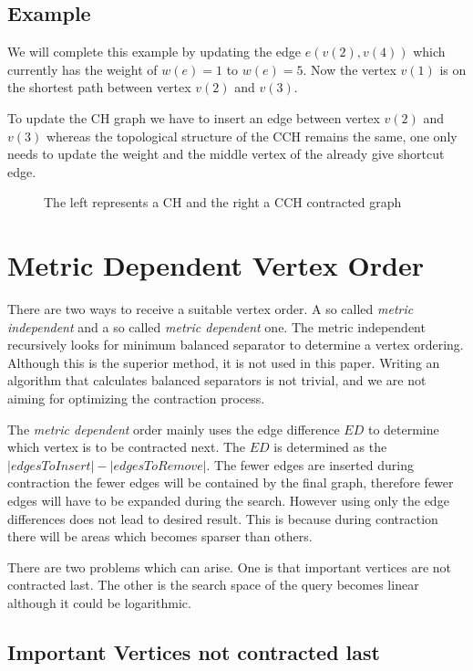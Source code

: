 \subsection{Example} 
We will complete this example by updating the edge $e(v(2), v(4))$ which currently has the weight of $w(e)=1$ to $w(e) = 5$.
Now the vertex $v(1)$ is on the shortest path between vertex $v(2)$ and $v(3)$.

To update the CH graph we have to insert an edge between vertex $v(2)$ and $v(3)$ whereas the topological structure of the CCH remains the same, one only needs to update the weight and the middle vertex of the already give shortcut edge.

\begin{figure}
    \centering
    
    \caption{The left represents a CH and the right a CCH contracted graph}
    \label{fig:DifferenceCHAndCCH}
\end{figure}

\section{Metric Dependent Vertex Order}\label{sec:metric_dependent_vertex_order}
There are two ways to receive a suitable vertex order.
A so called \textit{metric independent} and a so called \textit{metric dependent} one.
The metric independent recursively looks for minimum balanced separator to determine a vertex ordering\cite{CCH}.
Although this is the superior method, it is not used in this paper. 
Writing an algorithm that calculates balanced separators is not trivial, and we are not aiming for optimizing the contraction process.

The \textit{metric dependent} order mainly uses the edge difference $ED$ to determine which vertex is to be contracted next.
The $ED$ is determined as the $|edges To Insert| - |edges To Remove|$.
The fewer edges are inserted during contraction the fewer edges will be contained by the final graph, therefore fewer edges will have to be expanded during the search.
However using only the edge differences does not  lead to desired result.
This is because during contraction there will be areas which becomes sparser than others.

There are two problems which can arise.
One is that important vertices are not contracted last.
The other is the search space of the query becomes linear although it could be logarithmic.

\subsection{Important Vertices not contracted last}\label{sec:not_contracted_last}


